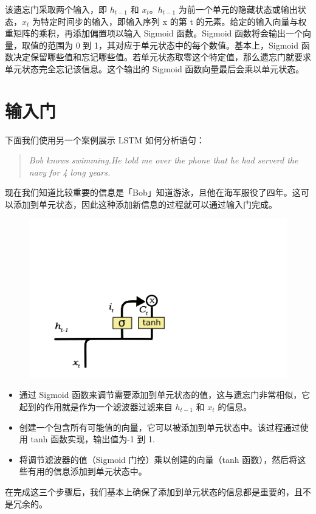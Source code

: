 \documentclass{article}
\begin{document}
该遗忘门采取两个输入，即 $h_{t-1}$ 和 $x_t$。$h_{t-1}$ 为前一个单元的隐藏状态或输出状态，$x_t$ 为特定时间步的输入，即输入序列 x 的第 t 的元素。给定的输入向量与权重矩阵的乘积，再添加偏置项以输入 Sigmoid 函数。Sigmoid 函数将会输出一个向量，取值的范围为 0 到 1，其对应于单元状态中的每个数值。基本上，Sigmoid 函数决定保留哪些值和忘记哪些值。若单元状态取零这个特定值，那么遗忘门就要求单元状态完全忘记该信息。这个输出的 Sigmoid 函数向量最后会乘以单元状态。
\section{输入门}

下面我们使用另一个案例展示 LSTM 如何分析语句：
\begin{quote}
	\emph{Bob knows swimming.He told me over the phone that he had serverd the navy for 4 long years.}
\end{quote}
现在我们知道比较重要的信息是「Bob」知道游泳，且他在海军服役了四年。这可以添加到单元状态，因此这种添加新信息的过程就可以通过输入门完成。
\begin{figure}[H]
	\centering
	\includegraphics[scale=0.3]{4.png}
\end{figure}
\begin{itemize}
	\item     通过 Sigmoid 函数来调节需要添加到单元状态的值，这与遗忘门非常相似，它起到的作用就是作为一个滤波器过滤来自 $h_{t-1}$ 和 $x_t$ 的信息。

\item     创建一个包含所有可能值的向量，它可以被添加到单元状态中。该过程通过使用 tanh 函数实现，输出值为-1 到 1.

\item     将调节滤波器的值（Sigmoid 门控）乘以创建的向量（tanh 函数），然后将这些有用的信息添加到单元状态中。
\end{itemize}
在完成这三个步骤后，我们基本上确保了添加到单元状态的信息都是重要的，且不是冗余的。
\end{document}

